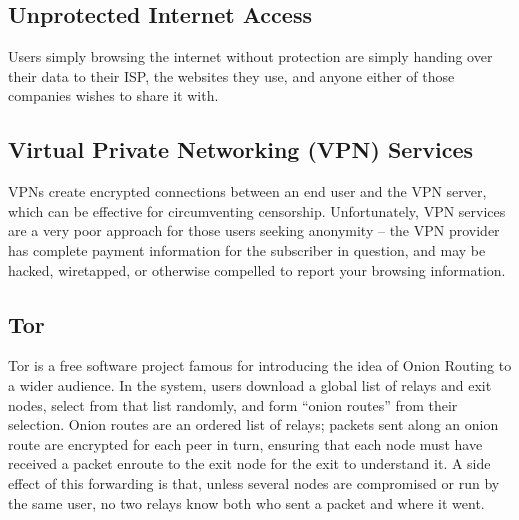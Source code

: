 
\subsection{Unprotected Internet Access}

Users simply browsing the internet without protection are simply
handing over their data to their ISP, the websites they use, and
anyone either of those companies wishes to share it with.

\subsection{Virtual Private Networking (VPN) Services}

VPNs create encrypted connections between an end user and the VPN
server, which can be effective for circumventing
censorship. Unfortunately, VPN services are a very poor approach for
those users seeking anonymity – the VPN provider has complete payment
information for the subscriber in question, and may be hacked,
wiretapped, or otherwise compelled to report your browsing
information.

\subsection{Tor}

Tor\cite{TOR} is a free software project famous for introducing the
idea of Onion Routing to a wider audience. In the system, users
download a global list of relays and exit nodes, select from that list
randomly, and form ``onion routes'' from their selection. Onion routes
are an ordered list of relays; packets sent along an onion route are
encrypted for each peer in turn, ensuring that each node must have
received a packet enroute to the exit node for the exit to understand
it. A side effect of this forwarding is that, unless several nodes are
compromised or run by the same user, no two relays know both who sent
a packet and where it went.






